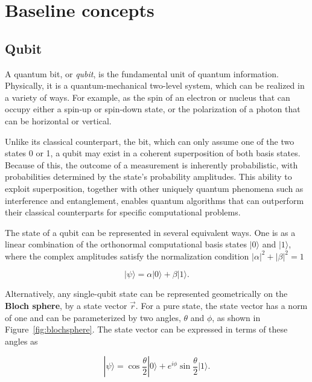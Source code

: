 \section{Baseline concepts}
\label{sec:Baseline}

\subsection{Qubit}
\label{subsec:qubit}

A quantum bit, or \emph{qubit}, is the fundamental unit of quantum information. Physically, it is a quantum-mechanical two-level system, which can be realized in a variety of ways. For example, as the spin of an electron or nucleus that can occupy either a spin-up or spin-down state, or the polarization of a photon that can be horizontal or vertical.

Unlike its classical counterpart, the bit, which can only assume one of the two states 0 or 1, a qubit may exist in a coherent superposition of both basis states. Because of this, the outcome of a measurement is inherently probabilistic, with probabilities determined by the state's probability amplitudes. This ability to exploit superposition, together with other uniquely quantum phenomena such as interference and entanglement, enables quantum algorithms that can outperform their classical counterparts for specific computational problems.

The state of a qubit can be represented in several equivalent ways. One is as a linear combination of the orthonormal computational basis states \(|0\rangle\) and \(|1\rangle\), where the complex amplitudes satisfy the normalization condition \(|\alpha|^2+|\beta|^2=1\)

\begin{equation}
    |\psi\rangle=\alpha|0\rangle+\beta|1\rangle.
    \label{eq:qubitlinearcomb}
\end{equation}

Alternatively, any single-qubit state can be represented geometrically on the \textbf{Bloch sphere}, by a state vector \(\vec{r}\). For a pure state, the state vector has a norm of one and can be parameterized by two angles, \(\theta\) and \(\phi\), as shown in Figure~\ref{fig:blochsphere}. The state vector can be expressed in terms of these angles as

\begin{equation}
    |\psi\rangle=\cos\frac{\theta}{2}|0\rangle+e^{i\phi}\sin\frac{\theta}{2}|1\rangle.
    \label{eq:blochsphere}
\end{equation}

